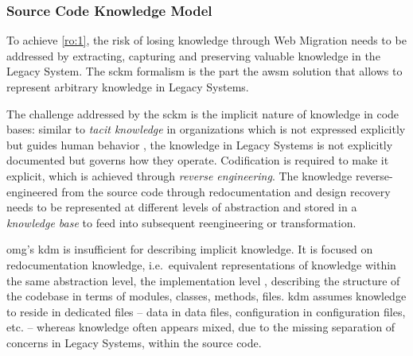 \subsubsection*{Source Code Knowledge Model}
To achieve \cref{ro:1}, the risk of losing knowledge through \gls{Web Migration} needs to be addressed by extracting, capturing and preserving valuable knowledge in the \gls{Legacy System}.
The \gls{sckm} formalism is the part the \gls{awsm} solution that allows to represent arbitrary knowledge in \glspl{Legacy System}.

The challenge addressed by the \gls{sckm} is the implicit nature of knowledge in  code bases: similar to \emph{tacit knowledge} in organizations which is
not expressed explicitly but guides human behavior \autocite{Nonaka2008TacitKnowledge}, the knowledge in \glspl{Legacy System} is not explicitly documented but governs how they operate.
Codification \autocite{Hansen1999KnowledgeManagement} is required to make it explicit, which is achieved through \emph{reverse engineering}.
The knowledge reverse-engineered from the  source code through redocumentation and design recovery needs to be represented at different levels of abstraction \autocite{Chikofsky1990ReverseEngineering} and stored in a \emph{knowledge base} \autocite{ISO/IEEE24765Vocabulary} to feed into subsequent reengineering or transformation.


\gls{omg}'s \gls{kdm} is insufficient for describing implicit knowledge.
It is focused on redocumentation knowledge, i.e.~equivalent representations of knowledge within the same abstraction level, the implementation level \autocite{Chikofsky1990ReverseEngineering}, describing the structure of the  codebase in terms of modules, classes, methods, files.
\gls{kdm} assumes knowledge to reside in dedicated files -- data in data files, configuration in configuration files, etc.
-- whereas knowledge often appears mixed, due to the missing separation of concerns in \glspl{Legacy System}, within the source code.

